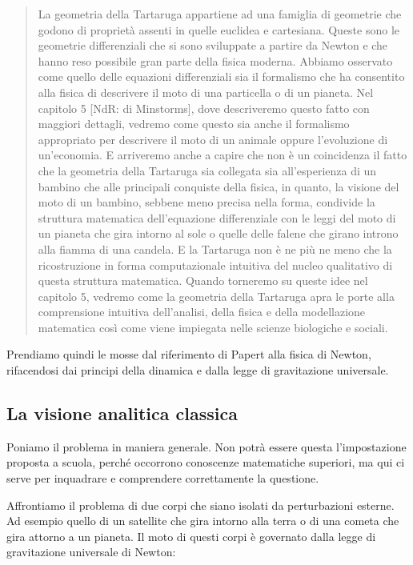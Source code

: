 \begin{quote}
La geometria della Tartaruga appartiene ad una famiglia di geometrie che godono di proprietà assenti in quelle euclidea e cartesiana. Queste sono le geometrie differenziali che si sono sviluppate a partire da Newton e che hanno reso possibile gran parte della fisica moderna. Abbiamo osservato come quello delle equazioni differenziali sia il formalismo che ha consentito alla fisica di descrivere  il moto di una particella o di un pianeta. Nel capitolo 5 [NdR: di Minstorms], dove descriveremo questo fatto con maggiori dettagli, vedremo come questo sia anche il formalismo appropriato per descrivere il moto di un animale oppure l'evoluzione di un'economia. E arriveremo anche a capire che non è un coincidenza il fatto che la geometria della Tartaruga sia collegata sia all'esperienza di un bambino che alle principali conquiste della fisica, in quanto, la visione del moto di un bambino, sebbene meno precisa nella forma, condivide la struttura matematica dell'equazione differenziale con le leggi del moto di un pianeta che gira intorno al sole o quelle delle falene che girano introno alla fiamma di una candela. E la Tartaruga non è ne più ne meno che la ricostruzione in forma computazionale intuitiva del nucleo qualitativo di questa struttura matematica. Quando torneremo su queste idee  nel capitolo 5, vedremo come la geometria della Tartaruga apra le porte alla comprensione intuitiva dell'analisi, della fisica e della modellazione matematica così come viene impiegata nelle scienze biologiche e sociali.

\end{quote}

Prendiamo quindi le mosse dal riferimento di Papert alla fisica di Newton, rifacendosi dai principi della dinamica e dalla legge di gravitazione universale.

\subsection{La visione analitica classica}

Poniamo il problema in maniera generale. Non potrà essere questa l'impostazione proposta a scuola, perché occorrono conoscenze matematiche superiori, ma qui ci serve per inquadrare e comprendere correttamente la questione.

Affrontiamo il problema di due corpi che siano isolati da perturbazioni esterne. Ad esempio quello di un satellite che gira intorno alla terra o di una cometa che gira attorno a un pianeta. Il moto di questi corpi è governato dalla legge di gravitazione universale di Newton:

